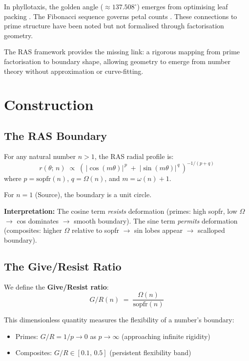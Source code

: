 \documentclass[11pt,a4paper]{article}
\begin{document}
In phyllotaxis, the golden angle ($\approx 137.508^\circ$) emerges from optimising leaf packing \cite{douady1992}. The Fibonacci sequence governs petal counts \cite{jean1994}. These connections to prime structure have been noted but not formalised through factorisation geometry.

The RAS framework \cite{ras2026} provides the missing link: a rigorous mapping from prime factorisation to boundary shape, allowing geometry to emerge from number theory without approximation or curve-fitting.

\section{Construction}

\subsection{The RAS Boundary}

For any natural number $n > 1$, the RAS radial profile is:
\begin{equation}
    r(\theta;\, n) \;\propto\; \left(\, |\cos(m\theta)|^{\,p} \;+\; |\sin(m\theta)|^{\,q} \,\right)^{-1/(p+q)}
    \label{eq:ras}
\end{equation}
where $p = \mathrm{sopfr}(n)$, $q = \Omega(n)$, and $m = \omega(n) + 1$.

For $n = 1$ (Source), the boundary is a unit circle.

\textbf{Interpretation:} The cosine term \emph{resists} deformation (primes: high sopfr, low $\Omega$ $\to$ cos dominates $\to$ smooth boundary). The sine term \emph{permits} deformation (composites: higher $\Omega$ relative to sopfr $\to$ sin lobes appear $\to$ scalloped boundary).

\subsection{The Give/Resist Ratio}

We define the \textbf{Give/Resist ratio}:
\begin{equation}
    G\!/\!R(n) \;=\; \frac{\Omega(n)}{\mathrm{sopfr}(n)}
    \label{eq:gr}
\end{equation}

This dimensionless quantity measures the flexibility of a number's boundary:
\begin{itemize}[nosep]
    \item Primes: $G\!/\!R = 1/p \to 0$ as $p \to \infty$ (approaching infinite rigidity)
    \item Composites: $G\!/\!R \in [0.1,\, 0.5]$ (persistent flexibility band)
\end{itemize}
\end{document}
